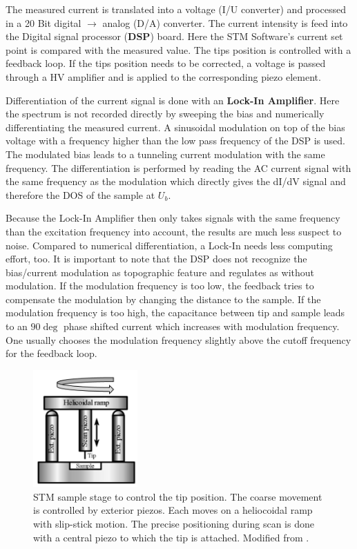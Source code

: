 The measured current is translated into a voltage (I/U converter) and processed in a 20 Bit digital $\rightarrow$ analog (D/A) converter. The current intensity is feed into the Digital signal processor (\textbf{DSP}) board. Here the STM Software's current set point is compared with the measured value. The tips position is controlled with a feedback loop. If the tips position needs to be corrected, a voltage is passed through a HV amplifier and is applied to the corresponding piezo element. 

Differentiation of the current signal is done with an \textbf{Lock-In Amplifier}. Here the spectrum is not recorded directly by sweeping the bias and numerically differentiating the measured current. A sinusoidal modulation on top of the bias voltage with a frequency higher than the low pass frequency of the DSP is used. The modulated bias leads to a tunneling current modulation with the same frequency. The differentiation is performed by reading the AC current signal with the same frequency as the modulation which directly gives the dI/dV signal and therefore the DOS of the sample at $U_b$. 

Because the Lock-In Amplifier then only takes signals with the same frequency than the excitation frequency into account, the results are much less suspect to noise. Compared to numerical differentiation, a Lock-In needs less computing effort, too. It is important to note that the DSP does not recognize the bias/current modulation as topographic feature and regulates as without modulation. If the modulation frequency is too low, the feedback tries to compensate the modulation by changing the distance to the sample. If the modulation frequency is too high, the capacitance between tip and sample leads to an $90\deg$ phase shifted current which increases with modulation frequency. One usually chooses the modulation frequency slightly above the cutoff frequency for the feedback loop.

\begin{figure} \centering
	\includegraphics[width=4cm]{./images/STM-sketch-2}
	\caption{STM sample stage to control the tip position. The coarse movement is controlled by exterior piezos. Each moves on a heliocoidal ramp with slip-stick motion. The precise positioning during scan is done with a central piezo to which the tip is attached. Modified from \cite{heliocoidal_ramp_2018}.}
	\label{fig:stm-heliocoidal-ramp}
\end{figure}

